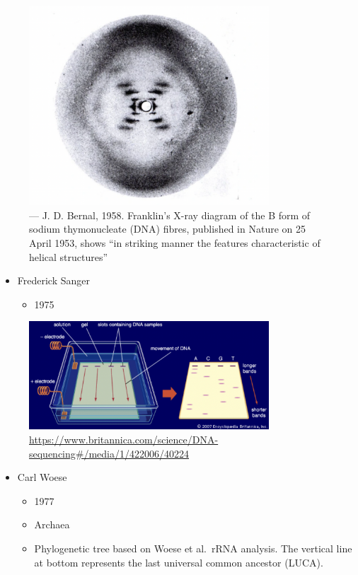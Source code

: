 \documentclass[
]{book}
\providecommand{\tightlist}{%
  \setlength{\itemsep}{0pt}\setlength{\parskip}{0pt}}
\begin{document}
\begin{figure}
\centering
\includegraphics[width=0.8\textwidth,height=\textheight]{./Figures/Rosalind2.png}
\caption{--- J. D. Bernal, 1958. Franklin's X-ray diagram of the B form of sodium thymonucleate (DNA) fibres, published in Nature on 25 April 1953, shows ``in striking manner the features characteristic of helical structures''}
\end{figure}

\begin{itemize}
\tightlist
\item
  Frederick Sanger

  \begin{itemize}
  \tightlist
  \item
    1975
  \end{itemize}
\end{itemize}

\begin{figure}
\centering
\includegraphics[width=0.8\textwidth,height=\textheight]{./Figures/Sanger1.png}
\caption{\url{https://www.britannica.com/science/DNA-sequencing\#/media/1/422006/40224}}
\end{figure}

\begin{itemize}
\tightlist
\item
  Carl Woese

  \begin{itemize}
  \tightlist
  \item
    1977
  \item
    Archaea
  \item
    Phylogenetic tree based on Woese et al.~rRNA analysis. The vertical line at bottom represents the last universal common ancestor (LUCA).
  \end{itemize}
\end{itemize}
\end{document}
